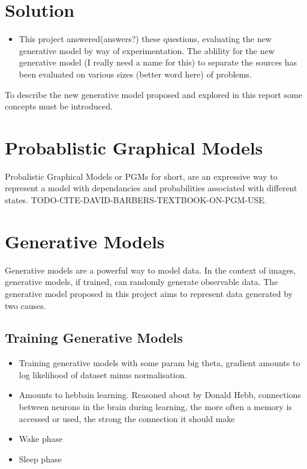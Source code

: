 \section{Solution}

\begin{itemize}
  \item This project answered(answers?) these questions, evaluating the new generative model by way of experimentation. The ablility for the new generative model (I really need a name for this)  to separate the sources has been evaluated on various sizes (better word here) of problems.
\end{itemize}

To describe the new generative model proposed and explored in this report some concepts must be introduced.

\section{Probablistic Graphical Models}

Probalistic Graphical Models or PGMs for short, are an expressive way to represent a model with dependancies and probabilities associated with different states. TODO-CITE-DAVID-BARBERS-TEXTBOOK-ON-PGM-USE.

\section{Generative Models}

Generative models are a powerful way to model data. In the context of images, generative models, if trained, can randomly generate observable data.
The generative model proposed in this project aims to represent data generated by two causes.

  \subsection{Training Generative Models}
  \begin{itemize}
    \item Training generative models with some param big theta, gradient amounts to log likelihood of dataset minus normalisation.
    \item Amounts to hebbain learning. Reasoned about by Donald Hebb, connections between neurons in the brain during learning, the more often a memory is accessed or used, the strong the connection it should make
    \item Wake phase
    \item Sleep phase
  \end{itemize}

